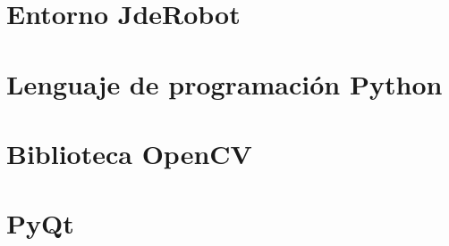 \section{Entorno JdeRobot}

\section{Lenguaje de programación Python}

\section{Biblioteca OpenCV}

\section{PyQt}